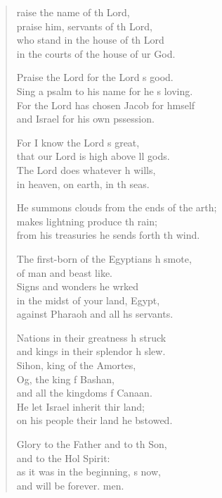 \settowidth{\versewidth}{He summons clouds from the ends of the earth; +}
\begin{verse}%
  \begin{patverse}
raise the name of th Lord,\Med\\
praise him, servants of th Lord,\\
who stand in the house of th Lord\Med\\
in the courts of the house of ur God.

Praise the Lord for the Lord \pointup{\i}s good.\Med\\
Sing a psalm to his name for he \pointup{\i}s loving.\\
For the Lord has chosen Jacob for h\pointup{\i}mself\Med\\
and Israel for his own pssession.

For I know the Lord \pointup{\i}s great,\Med\\
that our Lord is high above ll gods.\\
The Lord does whatever h wills,\Med\\
in heaven, on earth, in th seas.

He summons clouds from the ends of the arth;\Flex\\
makes lightning produce th rain;\Med\\
from his treasuries he sends forth th wind.

The first-born of the Egyptians h smote,\Med\\
of man and beast like.\\
Signs and wonders he wrked\Flex\\
in the midst of your land,  Egypt,\Med\\
against Pharaoh and all h\pointup{\i}s servants.

Nations in their greatness h struck\Med\\
and kings in their splendor h slew.\\
Sihon, king of the Amor\pointup{\i}tes,\Flex\\
Og, the king f Bashan,\Med\\
and all the kingdoms f Canaan.\\
He let Israel inherit thir land;\Med\\
on his people their land he bstowed.

Glory to the Father and to th Son,\Med\\
and to the Hol Spirit:\\
as it was in the beginning, \pointup{\i}s now,\Med\\
and will be forever. men.
  \end{patverse}
\end{verse}
